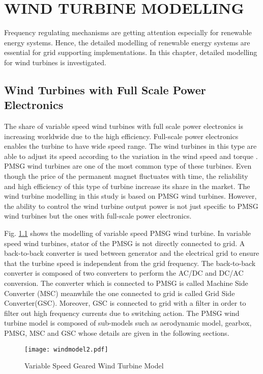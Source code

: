 \chapter{WIND TURBINE MODELLING}
\label{chp:3}
Frequency regulating mechanisms are getting attention especially for renewable energy systems. Hence, the detailed modelling of renewable energy systems are essential for grid supporting implementations. In this chapter, detailed modelling for wind turbines is investigated.
\section{Wind Turbines with Full Scale Power Electronics}
The share of variable speed wind turbines with full scale power electronics is increasing worldwide due to the high efficiency. Full-scale power electronics enables the turbine to have wide speed range. The wind turbines in this type are able to adjust its speed according to the variation in the wind speed and torque \cite{Chen2009b}. PMSG wind turbines are one of the most common type of these turbines. Even though the price of the permanent magnet fluctuates with time, the reliability and high efficiency of this type of turbine increase its share in the market. The wind turbine modelling in this study is based on PMSG wind turbines. However, the ability to control the wind turbine output power is not just specific to PMSG wind turbines but the ones with full-scale power electronics. \par
Fig. \ref{varspeedpmsg} shows the modelling of variable speed PMSG wind turbine. In variable speed wind turbines, stator of the PMSG is not directly connected to grid. A back-to-back converter is used between generator and the electrical grid to ensure that the turbine speed is independent from the grid frequency. The back-to-back converter is composed of two converters to perform the AC/DC and DC/AC conversion. The converter which is connected to PMSG is called Machine Side Converter (MSC) meanwhile the one connected to grid is called Grid Side Converter(GSC). Moreover, GSC is connected to grid with a filter in order to filter out high frequency currents due to switching action. The PMSG wind turbine model is composed of sub-models such as aerodynamic model, gearbox, PMSG, MSC and GSC whose details are given in the following sections.\par
 \begin{figure}[h]
	\centering
	\texttt{[image: windmodel2.pdf]}
	\caption{Variable Speed Geared Wind Turbine Model}
	\label{varspeedpmsg}
\end{figure} 
